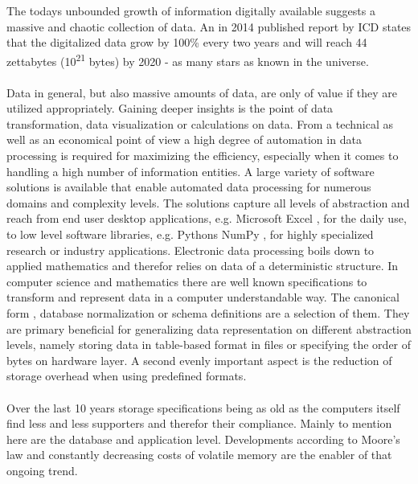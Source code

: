 The todays unbounded growth of information digitally available suggests a massive and chaotic collection of data. An in 2014 published report by ICD states that the digitalized data grow by 100\% every two years and will reach 44 zettabytes (10\textsuperscript{21} bytes) by 2020 - as many stars as known in the universe. 
\\\\
Data in general, but also massive amounts of data, are only of value if they are utilized appropriately. Gaining deeper insights is the point of data transformation, data visualization or calculations on data. From a technical as well as an economical point of view a high degree of automation in data processing is required for maximizing the efficiency, especially when it comes to handling a high number of information entities. 
A large variety of software solutions is available that enable automated data processing for numerous domains and complexity levels. The solutions capture all levels of abstraction and reach from end user desktop applications, e.g. Microsoft Excel
, for the daily use, to low level software libraries, e.g. Pythons NumPy
, for highly specialized research or industry applications. Electronic data processing boils down to applied mathematics and therefor relies on data of a deterministic structure. In computer science and mathematics there are well known specifications to transform and represent data in a computer understandable way. The canonical form
, database normalization
or schema definitions
are a selection of them. They are primary beneficial for generalizing data representation on different abstraction levels, namely storing data in table-based format in files or specifying the order of bytes on hardware layer. A second evenly important aspect is the reduction of storage overhead when using predefined formats.
\\\\
Over the last 10 years storage specifications being as old as the computers itself find less and less supporters and therefor their compliance. 
Mainly to mention here are the database and application level. Developments according to Moore's law
and constantly decreasing  costs of volatile memory are the enabler of that ongoing trend.
